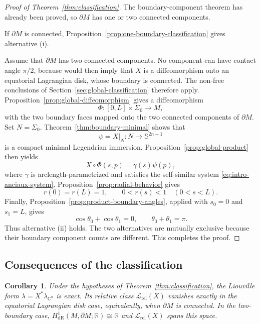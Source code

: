 \documentclass[11pt,a4paper]{article}
\numberwithin{equation}{section}
\newtheorem{corollary}[theorem]{Corollary}
\newcommand{\C}{\mathbb C}
\newcommand{\Sph}{\mathbb S}
\begin{document}
\begin{proof}[Proof of Theorem~\ref{thm:classification}]
The boundary-component theorem has already been proved, so $\partial M$ has one or two connected components.

If $\partial M$ is connected, Proposition~\ref{prop:one-boundary-classification} gives alternative \rm(i).

Assume that $\partial M$ has two connected components.  No component can have
contact angle $\pi/2$, because
\cite[Theorem~1.3]{GaoMaYao2026}
would then imply that $X$ is a diffeomorphism onto an equatorial Lagrangian
disk, whose boundary is connected.  The non-free conclusions of Section~\ref{sec:global-classification}
therefore apply.  Proposition~\ref{prop:global-diffeomorphism} gives a diffeomorphism
$$
        \Phi:[0,L]\times\Sigma_0\longrightarrow M,
$$
with the two boundary faces mapped onto the two connected components of $\partial M$.  Set $N=\Sigma_0$.  Theorem~\ref{thm:boundary-minimal} shows that
$$
        \psi=X|_N:N\longrightarrow\Sph^{2n-1}
$$
is a compact minimal Legendrian immersion.  Proposition~\ref{prop:global-product} then yields
$$
        X\circ\Phi(s,p)=\gamma(s)\psi(p),
$$
where $\gamma$ is arclength-parametrized and satisfies the self-similar system \eqref{eq:intro-anciaux-system}.  Proposition~\ref{prop:radial-behavior} gives
$$
        r(0)=r(L)=1,
        \qquad
        0<r(s)<1\quad(0<s<L).
$$
Finally, Proposition~\ref{prop:product-boundary-angles}, applied with $s_0=0$ and $s_1=L$, gives
$$
        \cos\theta_0+\cos\theta_1=0,
        \qquad
        \theta_0+\theta_1=\pi.
$$
Thus alternative \rm(ii) holds.  The two alternatives are mutually exclusive because their boundary component counts are different.  This completes the proof.
\end{proof}

\subsection{Consequences of the classification}

\begin{corollary}\label{cor:liouville-dichotomy}
Under the hypotheses of Theorem~\ref{thm:classification}, the Liouville
form $\lambda=X^*\lambda_{\C^n}$ is exact.  Its relative class $\mathcal L_{\mathrm{rel}}(X)$ vanishes exactly in the equatorial Lagrangian disk case, equivalently, when $\partial M$ is connected. 
In the two-boundary case,
\(
        H^1_{\mathrm{dR}}(M,\partial M;\mathbb R)\cong\mathbb R
\)
and $\mathcal L_{\mathrm{rel}}(X)$ spans this space.
\end{corollary}
\end{document}
